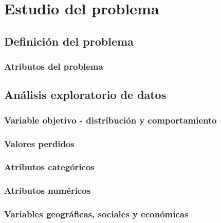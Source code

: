 \chapter{Estudio del problema}

\section{Definición del problema}

\subsection{Atributos del problema}

\section{Análisis exploratorio de datos}

\subsection{Variable objetivo - distribución y comportamiento}

\subsection{Valores perdidos}

\subsection{Atributos categóricos}

\subsection{Atributos numéricos}

\subsection{Variables geográficas, sociales y económicas}
